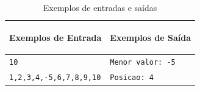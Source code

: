 \begin{table}[!ht]
    \centering
    \begin{tabular}{|p{7cm}|p{7cm}|}
        \hline
        \begin{center}
            \vspace{-0.3cm}
            \textbf{Exemplos de Entrada}
            \vspace{-0.3cm}
        \end{center} 
         &  
        \begin{center}
            \vspace{-0.3cm}
            \textbf{Exemplos de Saída}
            \vspace{-0.3cm}
        \end{center} \\ \hline
         \texttt{10} & \texttt{Menor valor: -5} \\
         \hline
         \texttt{1,2,3,4,-5,6,7,8,9,10} & \texttt{Posicao: 4} \\
         \hline
    \end{tabular}
    \caption{Exemplos de entradas e saídas}
    \label{tabela02}
\end{table}



